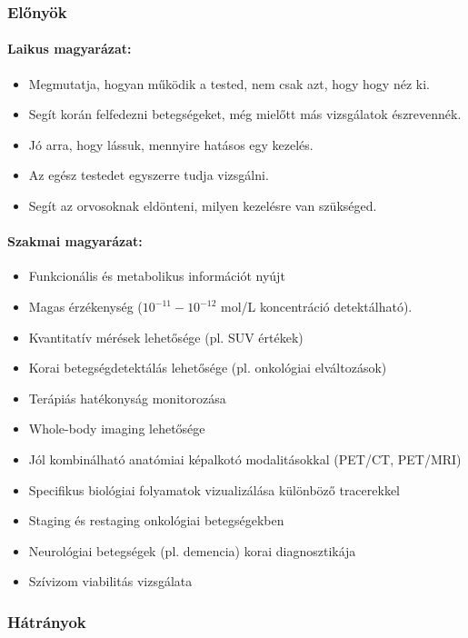 \documentclass[a4paper,12pt]{article}
\begin{document}
\subsubsection{Előnyök}

\paragraph{Laikus magyarázat:} \begin{itemize} \item Megmutatja, hogyan működik a tested, nem csak azt, hogy hogy néz ki. \item Segít korán felfedezni betegségeket, még mielőtt más vizsgálatok észrevennék. \item Jó arra, hogy lássuk, mennyire hatásos egy kezelés. \item Az egész testedet egyszerre tudja vizsgálni. \item Segít az orvosoknak eldönteni, milyen kezelésre van szükséged. \end{itemize}

\paragraph{Szakmai magyarázat:} \begin{itemize} \item Funkcionális és metabolikus információt nyújt 
    \item Magas érzékenység (\(10^{-11} - 10^{-12}\) mol/L koncentráció detektálható).
\item Kvantitatív mérések lehetősége (pl. SUV értékek) \item Korai betegségdetektálás lehetősége (pl. onkológiai elváltozások) \item Terápiás hatékonyság monitorozása \item Whole-body imaging lehetősége \item Jól kombinálható anatómiai képalkotó modalitásokkal (PET/CT, PET/MRI) \item Specifikus biológiai folyamatok vizualizálása különböző tracerekkel \item Staging és restaging onkológiai betegségekben \item Neurológiai betegségek (pl. demencia) korai diagnosztikája \item Szívizom viabilitás vizsgálata \end{itemize}

\subsubsection{Hátrányok}
\end{document}
